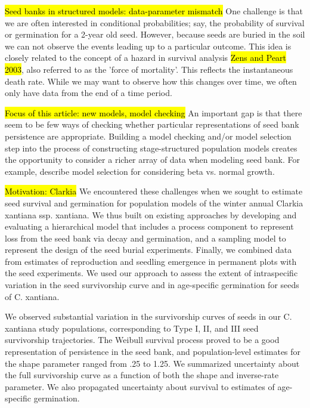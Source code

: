 \documentclass[12pt, oneside, titlepage]{article}   	%
\begin{document}
\hl{Seed banks in structured models: data-parameter mismatch} One challenge is that we are often interested in conditional probabilities; say, the probability of survival or germination for a 2-year old seed. However, because seeds are buried in the soil we can not observe the events leading up to a particular outcome. This idea is closely related to the concept of a hazard in survival analysis \hl{Zens and Peart 2003}, also referred to as the 'force of mortality'. This reflects the instantaneous death rate. While we may want to observe how this changes over time, we often only have data from the end of a time period. 

\hl{Focus of this article: new models, model checking} An important gap is that there seem to be few ways of checking whether particular representations of seed bank persistence are appropriate. Building a model checking and/or model selection step into the process of constructing stage-structured population models creates the opportunity to consider a richer array of data when modeling seed bank. For example, \cite{peterson2019} describe model selection for considering beta vs. normal growth.

\hl{Motivation: Clarkia} We encountered these challenges when we sought to estimate seed survival and germination for population models of the winter annual Clarkia xantiana ssp. xantiana. We thus built on existing approaches by developing and evaluating a hierarchical model that includes a process component to represent loss from the seed bank via decay and germination, and a sampling model to represent the design of the seed burial experiments. Finally, we combined data from estimates of reproduction and seedling emergence in permanent plots with the seed experiments. We used our approach to assess the extent of intraspecific variation in the seed survivorship curve and in age-specific germination for seeds of C. xantiana.

We observed substantial variation in the survivorship curves of seeds in our C. xantiana study populations, corresponding to Type I, II, and III seed survivorship trajectories. The Weibull survival process proved to be a good representation of persistence in the seed bank, and population-level estimates for the shape parameter ranged from .25 to 1.25. We summarized uncertainty about the full survivorship curve as a function of both the shape and inverse-rate parameter. We also propagated uncertainty about survival to estimates of age-specific germination.
\end{document}
